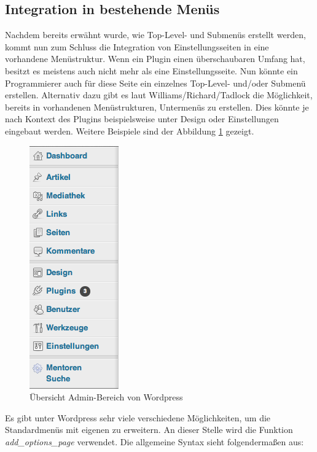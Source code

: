 \subsection{Integration in bestehende Menüs}\label{integration}
Nachdem bereits erwähnt wurde, wie Top-Level- und Submenüs erstellt werden, kommt nun zum Schluss die Integration von Einstellungsseiten in eine vorhandene Menüstruktur.\newline
Wenn ein Plugin einen überschaubaren Umfang hat, besitzt es meistens auch nicht mehr als eine Einstellungsseite. Nun könnte ein Programmierer auch für diese Seite ein einzelnes Top-Level- und/oder Submenü erstellen. Alternativ dazu gibt es laut Williams/Richard/Tadlock die Möglichkeit, bereits in vorhandenen Menüstrukturen, Untermenüs zu erstellen. Dies könnte je nach Kontext des Plugins beispielsweise unter Design oder Einstellungen eingebaut werden. Weitere Beispiele sind der Abbildung \ref{img:UEADWP} gezeigt.
  \begin{figure}[htbp]
	\begin{center}
		\includegraphics[angle={360}, scale=0.48]{pictures/dash.png}
	    \caption{Übersicht Admin-Bereich von Wordpress}
	    \label{img:UEADWP}
	    	\end{center}
   \end{figure}
\newpage Es gibt unter Wordpress sehr viele verschiedene Möglichkeiten, um die Standardmenüs mit eigenen zu erweitern. An dieser Stelle wird die Funktion \emph{add\_options\_page} verwendet. Die allgemeine Syntax sieht folgendermaßen aus:
